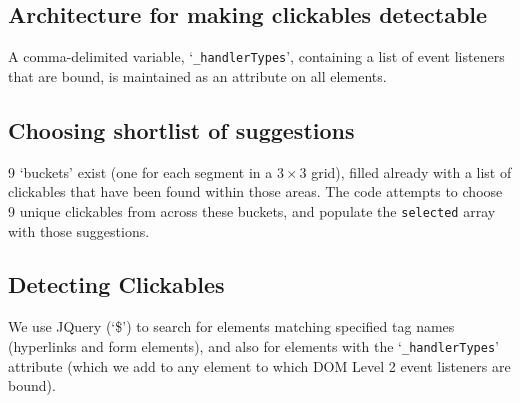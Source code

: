 \documentclass[11pt,openright,a4paper]{report}
\begin{document}
\begin{landscape}
\begin{multicols}{2}
\subsection{Architecture for making clickables detectable}
 A comma-delimited variable, `\texttt{\_handlerTypes}', containing a list of event listeners that are bound, is maintained as an attribute on all elements.
\FloatBarrier

\subsection{Choosing shortlist of suggestions}
9 `buckets' exist (one for each segment in a $3\times3$ grid), filled already with a list of clickables that have been found within those areas. The code attempts to choose 9 unique clickables from across these buckets, and populate the \texttt{selected} array with those suggestions.

\FloatBarrier
\subsection{Detecting Clickables}
We use JQuery (`\$') to search for elements matching specified tag names (hyperlinks and form elements), and also for elements with the `\texttt{\_handlerTypes}' attribute (which we add to any element to which DOM Level 2 event listeners are bound).

\FloatBarrier
\end{multicols}
\end{landscape}

\end{document}
